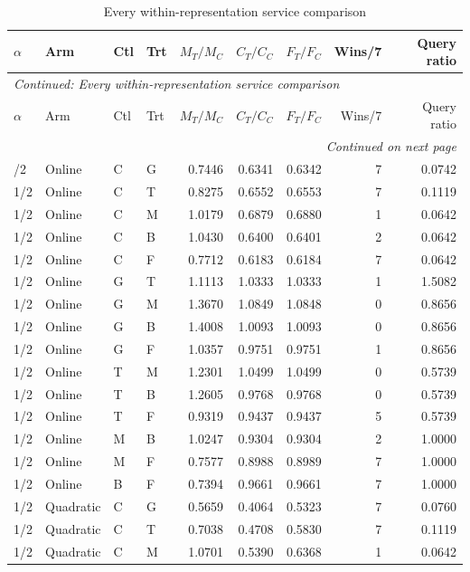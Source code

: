 \begingroup\footnotesize\setlength{\tabcolsep}{3pt}
\begin{longtable}{llllrrrrr}
\caption{Every within-representation service comparison}\label{tab:allservices119c}\\
\toprule
$\alpha$ & Arm & Ctl & Trt & $M_T/M_C$ & $C_T/C_C$ & $F_T/F_C$ & Wins/7 & Query ratio\\\midrule
\endfirsthead
\multicolumn{9}{l}{\textit{Continued: Every within-representation service comparison}}\\
\toprule
$\alpha$ & Arm & Ctl & Trt & $M_T/M_C$ & $C_T/C_C$ & $F_T/F_C$ & Wins/7 & Query ratio\\\midrule
\endhead
\midrule\multicolumn{9}{r}{\textit{Continued on next page}}\\
\endfoot
\bottomrule
\endlastfoot
1/2 & Online & C & G & 0.7446 & 0.6341 & 0.6342 & 7 & 0.0742 \\
1/2 & Online & C & T & 0.8275 & 0.6552 & 0.6553 & 7 & 0.1119 \\
1/2 & Online & C & M & 1.0179 & 0.6879 & 0.6880 & 1 & 0.0642 \\
1/2 & Online & C & B & 1.0430 & 0.6400 & 0.6401 & 2 & 0.0642 \\
1/2 & Online & C & F & 0.7712 & 0.6183 & 0.6184 & 7 & 0.0642 \\
1/2 & Online & G & T & 1.1113 & 1.0333 & 1.0333 & 1 & 1.5082 \\
1/2 & Online & G & M & 1.3670 & 1.0849 & 1.0848 & 0 & 0.8656 \\
1/2 & Online & G & B & 1.4008 & 1.0093 & 1.0093 & 0 & 0.8656 \\
1/2 & Online & G & F & 1.0357 & 0.9751 & 0.9751 & 1 & 0.8656 \\
1/2 & Online & T & M & 1.2301 & 1.0499 & 1.0499 & 0 & 0.5739 \\
1/2 & Online & T & B & 1.2605 & 0.9768 & 0.9768 & 0 & 0.5739 \\
1/2 & Online & T & F & 0.9319 & 0.9437 & 0.9437 & 5 & 0.5739 \\
1/2 & Online & M & B & 1.0247 & 0.9304 & 0.9304 & 2 & 1.0000 \\
1/2 & Online & M & F & 0.7577 & 0.8988 & 0.8989 & 7 & 1.0000 \\
1/2 & Online & B & F & 0.7394 & 0.9661 & 0.9661 & 7 & 1.0000 \\
1/2 & Quadratic & C & G & 0.5659 & 0.4064 & 0.5323 & 7 & 0.0760 \\
1/2 & Quadratic & C & T & 0.7038 & 0.4708 & 0.5830 & 7 & 0.1119 \\
1/2 & Quadratic & C & M & 1.0701 & 0.5390 & 0.6368 & 1 & 0.0642 \\

\end{longtable}

